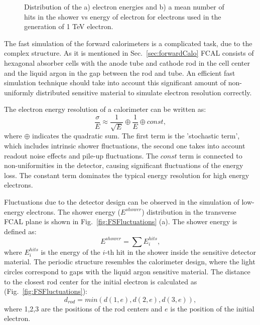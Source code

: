 \begin{figure}[!tbp]
\begin{minipage}[h]{0.49\linewidth}
\end{minipage}
\hfill
\begin{minipage}[h]{0.49\linewidth}
\end{minipage}
\caption{Distribution  of the a) electron energies and b) a mean number of hits in the shower vs energy of electron for electrons used in the generation of 1 TeV electron.}
\label{fig:TrackEnergy}
\end{figure}

The fast simulation of  the \atlas forward calorimeters is a complicated task, due to the complex structure. As it is mentioned in Sec.~\ref{sec:forwardCalo} FCAL consists of hexagonal absorber cells with the anode tube and cathode rod in the cell center and the liquid argon in the gap between the rod and tube. An efficient fast simulation technique should take into account this significant amount of non-uniformly distributed sensitive material to simulate electron resolution correctly.

The electron energy resolution of a calorimeter can be written as\cite{Vovenko1983}:
\begin{equation}\label{eq:EMResoultion}
\frac{\sigma}{E} \approx \frac{1}{\sqrt{E}}	\oplus \frac{1}{E} 	\oplus const,
\end{equation}
where $\oplus$ indicates the quadratic sum. The first term is the 'stochastic term', which includes intrinsic shower fluctuations, the second  one takes into account readout noise effects and pile-up fluctuations. The $const$ term is connected to non-uniformities in the detector, causing significant fluctuations of the energy loss. The constant term dominates the typical energy resolution for high energy electrons. 

Fluctuations due to the detector design can be observed in the simulation of low-energy electrons. The shower energy ($E^{shower}$) distribution in the transverse FCAL plane is shown in Fig.~\ref{fig:FSFluctuations} (a). The shower energy is defined as:
\begin{equation}
E^{shower}=\sum E_i^{hits},
\end{equation}
where $E_i^{hits}$ is the energy of the $i$-th hit in the shower inside the sensitive detector material. The periodic structure resembles the calorimeter design, where the light circles correspond to gaps with the liquid argon sensitive material. The distance to the closest rod center for the initial electron is calculated as (Fig.~\ref{fig:FSFluctuations}):
\begin{equation}
d_{rod} = min( d(1,e), d(2, e), d(3, e)),
\end{equation} 
where 1,2,3 are the positions of the rod centers and $e$ is the position of the initial electron.

